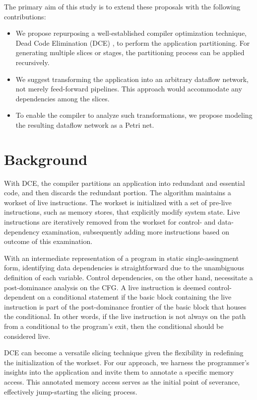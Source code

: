 \documentclass{acaces}
\begin{document}
The primary aim of this study is to extend these proposals with the following contributions:
\begin{itemize}
  
\item We propose repurposing a well-established compiler optimization technique, Dead Code Elimination (DCE) \cite{cytron_efficiently_1991}, to perform the application partitioning.
      For generating multiple slices or stages, the partitioning process can be applied recursively.

\item We suggest transforming the application into an arbitrary dataflow network, not merely feed-forward pipelines.
      This approach would accommodate any dependencies among the slices.

\item To enable the compiler to analyze such transformations, we propose modeling the resulting dataflow network as a Petri net.

\end{itemize}

\section{Background}

With DCE, the compiler partitions an application into redundant and essential code, and then discards the redundant portion.
The algorithm maintains a workset of live instructions.
The workset is initialized with a set of pre-live instructions, such as memory stores, that explicitly modify system state.
Live instructions are iteratively removed from the workset for control- and data-dependency examination,
subsequently adding more instructions based on outcome of this examination.

With an intermediate representation of a program in static single-assingment form,
identifying data dependencies is straightforward due to the unambiguous definition of each variable.
Control dependencies, on the other hand, necessitate a post-dominance analysis on the CFG.
A live instruction is deemed control-dependent on a conditional statement if the basic block containing the live instruction is part of the post-dominance frontier of the basic block that houses the conditional. 
In other words, if the live instruction is not always on the path from a conditional to the program's exit, then the conditional should be considered live.

DCE can become a versatile slicing technique given the flexibility in redefining the initialization of the workset.
For our approach, we harness the programmer's insights into the application and invite them to annotate a specific memory access.
This annotated memory access serves as the initial point of severance, effectively jump-starting the slicing process.
\end{document}
